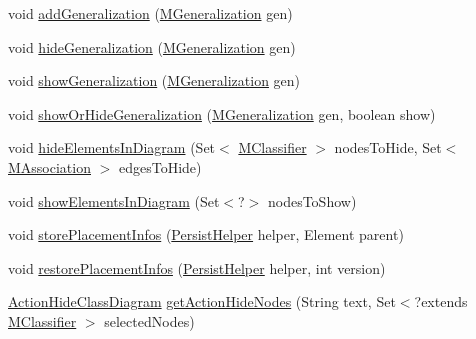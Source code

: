 \begin{DoxyCompactItemize}
\item 
void \hyperlink{classorg_1_1tzi_1_1use_1_1gui_1_1views_1_1diagrams_1_1classdiagram_1_1_class_diagram_adf9dfb2ef4124965a8306ec3210d3f39}{add\-Generalization} (\hyperlink{classorg_1_1tzi_1_1use_1_1uml_1_1mm_1_1_m_generalization}{M\-Generalization} gen)
\item 
void \hyperlink{classorg_1_1tzi_1_1use_1_1gui_1_1views_1_1diagrams_1_1classdiagram_1_1_class_diagram_aa972e4fc84ecbd1738d7c680b81985eb}{hide\-Generalization} (\hyperlink{classorg_1_1tzi_1_1use_1_1uml_1_1mm_1_1_m_generalization}{M\-Generalization} gen)
\item 
void \hyperlink{classorg_1_1tzi_1_1use_1_1gui_1_1views_1_1diagrams_1_1classdiagram_1_1_class_diagram_a51c1ac52f9d5d48f2c455280bd260cd7}{show\-Generalization} (\hyperlink{classorg_1_1tzi_1_1use_1_1uml_1_1mm_1_1_m_generalization}{M\-Generalization} gen)
\item 
void \hyperlink{classorg_1_1tzi_1_1use_1_1gui_1_1views_1_1diagrams_1_1classdiagram_1_1_class_diagram_abd2cd0caafe523d5c696c75ae26b3f94}{show\-Or\-Hide\-Generalization} (\hyperlink{classorg_1_1tzi_1_1use_1_1uml_1_1mm_1_1_m_generalization}{M\-Generalization} gen, boolean show)
\item 
void \hyperlink{classorg_1_1tzi_1_1use_1_1gui_1_1views_1_1diagrams_1_1classdiagram_1_1_class_diagram_adabf4502238fc5f7be850172a7aecd54}{hide\-Elements\-In\-Diagram} (Set$<$ \hyperlink{interfaceorg_1_1tzi_1_1use_1_1uml_1_1mm_1_1_m_classifier}{M\-Classifier} $>$ nodes\-To\-Hide, Set$<$ \hyperlink{interfaceorg_1_1tzi_1_1use_1_1uml_1_1mm_1_1_m_association}{M\-Association} $>$ edges\-To\-Hide)
\item 
void \hyperlink{classorg_1_1tzi_1_1use_1_1gui_1_1views_1_1diagrams_1_1classdiagram_1_1_class_diagram_a03e77d851f1d3aeb979371a76bbfe330}{show\-Elements\-In\-Diagram} (Set$<$?$>$ nodes\-To\-Show)
\item 
void \hyperlink{classorg_1_1tzi_1_1use_1_1gui_1_1views_1_1diagrams_1_1classdiagram_1_1_class_diagram_af132a72f9fbd20e945483a71d64124a9}{store\-Placement\-Infos} (\hyperlink{classorg_1_1tzi_1_1use_1_1gui_1_1util_1_1_persist_helper}{Persist\-Helper} helper, Element parent)
\item 
void \hyperlink{classorg_1_1tzi_1_1use_1_1gui_1_1views_1_1diagrams_1_1classdiagram_1_1_class_diagram_a3458fb711eb68ce90f0ef883e2117a9a}{restore\-Placement\-Infos} (\hyperlink{classorg_1_1tzi_1_1use_1_1gui_1_1util_1_1_persist_helper}{Persist\-Helper} helper, int version)
\item 
\hyperlink{classorg_1_1tzi_1_1use_1_1gui_1_1views_1_1diagrams_1_1event_1_1_action_hide_class_diagram}{Action\-Hide\-Class\-Diagram} \hyperlink{classorg_1_1tzi_1_1use_1_1gui_1_1views_1_1diagrams_1_1classdiagram_1_1_class_diagram_ad79d5839e360ec168c4d2b3ca30967d6}{get\-Action\-Hide\-Nodes} (String text, Set$<$?extends \hyperlink{interfaceorg_1_1tzi_1_1use_1_1uml_1_1mm_1_1_m_classifier}{M\-Classifier} $>$ selected\-Nodes)

\end{DoxyCompactItemize}
